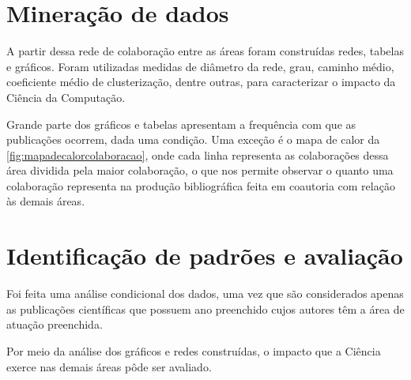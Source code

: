 \section{Mineração de dados}

A partir dessa rede de colaboração entre as áreas foram construídas redes, tabelas e gráficos. Foram utilizadas medidas de diâmetro da rede, grau, caminho médio, coeficiente médio de clusterização, dentre outras, para caracterizar o impacto da Ciência da Computação.

Grande parte dos gráficos e tabelas apresentam a frequência com que as publicações ocorrem, dada uma condição. Uma exceção é o mapa de calor da \autoref{fig:mapadecalorcolaboracao}, onde cada linha representa as colaborações dessa área dividida pela maior colaboração, o que nos permite observar o quanto uma colaboração representa na produção bibliográfica feita em coautoria com relação às demais áreas.

\section{Identificação de padrões e avaliação}

Foi feita uma análise condicional dos dados, uma vez que são considerados apenas as publicações científicas que possuem ano preenchido cujos autores têm a área de atuação preenchida.

Por meio da análise dos gráficos e redes construídas, o impacto que a Ciência exerce nas demais áreas pôde ser avaliado.
